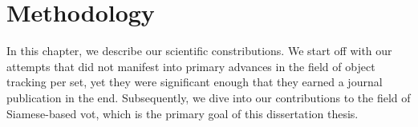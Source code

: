\chapter{Methodology}
\label{chap:Methodology}

In this chapter, we describe our scientific constributions. We start off with our attempts that did not manifest into primary advances in the field of object tracking per set, yet they were significant enough that they earned a journal publication in the end. Subsequently, we dive into our contributions to the field of Siamese-based \gls{vot}, which is the primary goal of this dissertation thesis.


